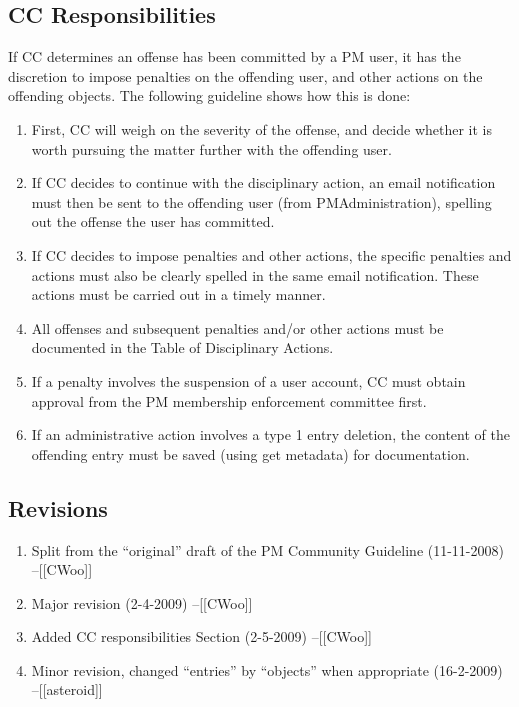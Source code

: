 \subsection*{CC Responsibilities}
If CC determines an offense has been committed by a PM user, it has the discretion to impose penalties on the offending user, and other actions on the offending objects. The following guideline shows how this is done:

\begin{enumerate}
\item First, CC will weigh on the severity of the offense, and decide whether it is worth pursuing the matter further with the offending user.
\item If CC decides to continue with the disciplinary action, an email notification must then be sent to the offending user (from PMAdministration), spelling out the offense the user has committed.
\item If CC decides to impose penalties and other actions, the specific penalties and actions must also be clearly spelled in the same email notification. These actions must be carried out in a timely manner.
\item All offenses and subsequent penalties and/or other actions must be documented in the Table of Disciplinary Actions.
\item If a penalty involves the suspension of a user account, CC must obtain approval from the PM membership enforcement committee first.
\item If an administrative action involves a type 1 entry deletion, the content of the offending entry must be saved (using get metadata) for documentation.
\end{enumerate}


\subsection*{Revisions}

\begin{enumerate}
\item Split from the ``original'' draft of the PM Community Guideline (11-11-2008) --[[CWoo]]
\item Major revision (2-4-2009) --[[CWoo]]
\item Added CC responsibilities Section (2-5-2009) --[[CWoo]]
\item Minor revision, changed ``entries'' by ``objects'' when appropriate (16-2-2009) --[[asteroid]]
\end{enumerate}
